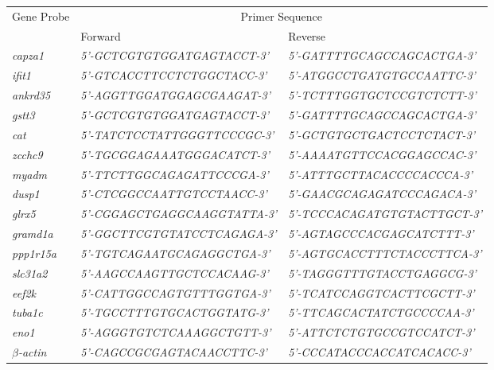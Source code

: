 \begin{table}[!hbtp]
\scriptsize
\centering
\begin{tabular}{p{1.5cm}|p{5cm}|p{5cm}}
\small{Gene Probe} & \multicolumn{2}{c}{\small{Primer Sequence}} \\
{} & \small{Forward} & \small{Reverse} \\
\hline
\small{\textit{capza1}} & {\textit{5’-GCTCGTGTGGATGAGTACCT-3’}} & {\textit{5’-GATTTTGCAGCCAGCACTGA-3’}} \\
\small{\textit{ifit1}} & {\textit{5’-GTCACCTTCCTCTGGCTACC-3’}} & {\textit{5’-ATGGCCTGATGTGCCAATTC-3’}} \\
\small{\textit{ankrd35}} & {\textit{5’-AGGTTGGATGGAGCGAAGAT-3’}} & {\textit{5’-TCTTTGGTGCTCCGTCTCTT-3’}} \\
\small{\textit{gstt3}} & {\textit{5’-GCTCGTGTGGATGAGTACCT-3’}} & {\textit{5’-GATTTTGCAGCCAGCACTGA-3’}} \\
\small{\textit{cat}} & {\textit{5’-TATCTCCTATTGGGTTCCCGC-3’}} & {\textit{5’-GCTGTGCTGACTCCTCTACT-3’}} \\
\small{\textit{zcchc9}} & {\textit{5’-TGCGGAGAAATGGGACATCT-3’}} & {\textit{5’-AAAATGTTCCACGGAGCCAC-3’}} \\
\small{\textit{myadm}} & {\textit{5’-TTCTTGGCAGAGATTCCCGA-3’}} & {\textit{5’-ATTTGCTTACACCCCACCCA-3’}} \\
\small{\textit{dusp1}} & {\textit{5’-CTCGGCCAATTGTCCTAACC-3’}} & {\textit{5’-GAACGCAGAGATCCCAGACA-3’}} \\
\small{\textit{glrx5}} & {\textit{5’-CGGAGCTGAGGCAAGGTATTA-3’}} & {\textit{5’-TCCCACAGATGTGTACTTGCT-3’}} \\
\small{\textit{gramd1a}} & {\textit{5’-GGCTTCGTGTATCCTCAGAGA-3’}} & {\textit{5’-AGTAGCCCACGAGCATCTTT-3’}} \\
\small{\textit{ppp1r15a}} & {\textit{5’-TGTCAGAATGCAGAGGCTGA-3’}} & {\textit{5’-AGTGCACCTTTCTACCCTTCA-3’}} \\
\small{\textit{slc31a2}} & {\textit{5’-AAGCCAAGTTGCTCCACAAG-3’}} & {\textit{5’-TAGGGTTTGTACCTGAGGCG-3’}} \\
\small{\textit{eef2k}} & {\textit{5’-CATTGGCCAGTGTTTGGTGA-3’}} & {\textit{5’-TCATCCAGGTCACTTCGCTT-3’}} \\
\small{\textit{tuba1c}} & {\textit{5’-TGCCTTTGTGCACTGGTATG-3’}} & {\textit{5’-TTCAGCACTATCTGCCCCAA-3’}} \\
\small{\textit{eno1}} & {\textit{5’-AGGGTGTCTCAAAGGCTGTT-3’}} & {\textit{5’-ATTCTCTGTGCCGTCCATCT-3’}} \\
\small{\textit{$\beta$-actin}} & {\textit{5’-CAGCCGCGAGTACAACCTTC-3’}} & {\textit{5’-CCCATACCCACCATCACACC-3’}} \\

\end{tabular}
\end{table}
